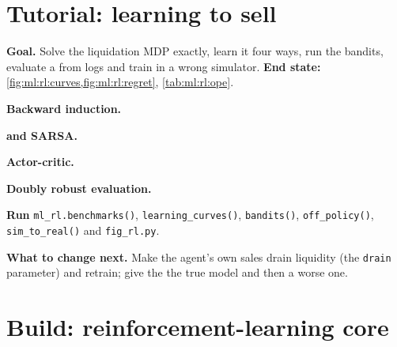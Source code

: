 \section{Tutorial: learning to sell}\label{tut:ml:reinforcement-learning-foundations:tut}

\begin{tutorial}
\textbf{Goal.} Solve the liquidation MDP exactly, learn it four ways, run the bandits, evaluate a  from logs and train
in a wrong simulator. \textbf{End state:} \cref{fig:ml:rl:curves,fig:ml:rl:regret}, \cref{tab:ml:rl:ope}.
\begin{tutsteps}
\item \textbf{Backward induction.}
\label{lst:ml:rl:solve}
\item \textbf{ and SARSA.}
\label{lst:ml:rl:qlearning}
\item \textbf{Actor-critic.}
\label{lst:ml:rl:ac}
\item \textbf{Doubly robust evaluation.}
\label{lst:ml:rl:dr}
\item \textbf{Run} \texttt{ml\_rl.benchmarks()}, \texttt{learning\_curves()}, \texttt{bandits()}, \texttt{off\_policy()},
\texttt{sim\_to\_real()} and \texttt{fig\_rl.py}.
\end{tutsteps}
\textbf{What to change next.} Make the agent's own sales drain liquidity (the \texttt{drain} parameter) and retrain; give the
 the true model and then a worse one.
\end{tutorial}

\section{Build: reinforcement-learning core}\label{bld:ml:reinforcement-learning-foundations:rlcore}

